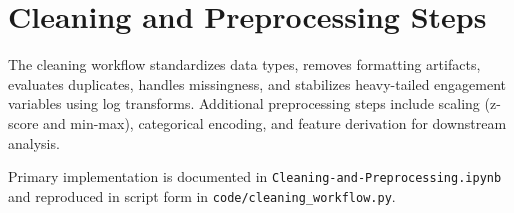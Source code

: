 \section{Cleaning and Preprocessing Steps}

The cleaning workflow standardizes data types, removes formatting artifacts, evaluates duplicates, handles missingness, and stabilizes heavy-tailed engagement variables using log transforms. Additional preprocessing steps include scaling (z-score and min-max), categorical encoding, and feature derivation for downstream analysis.

Primary implementation is documented in \texttt{Cleaning-and-Preprocessing.ipynb} and reproduced in script form in \texttt{code/cleaning\_workflow.py}.
